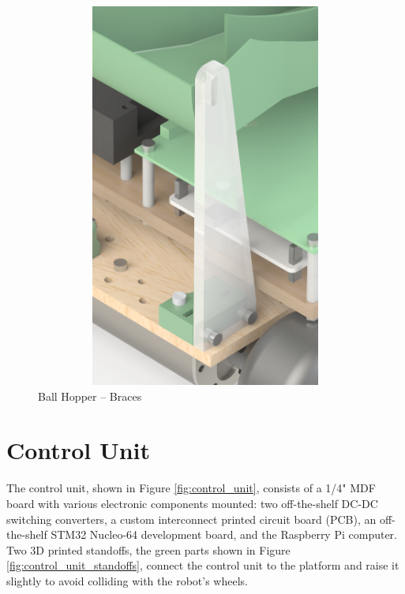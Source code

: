 \begin{figure}[H]   %
	\centering \includegraphics[width=6in, height=5in, keepaspectratio]{figures/hopper_brace.png}
	\caption{Ball Hopper -- Braces}	\label{fig:hopper_brace}
\end{figure}

\section{Control Unit}
The control unit, shown in Figure \ref{fig:control_unit}, consists of a 1/4" MDF board with various electronic components mounted: two off-the-shelf DC-DC switching converters, a custom interconnect printed circuit board (PCB), an off-the-shelf STM32 Nucleo-64 development board, and the Raspberry Pi computer. Two 3D printed standoffs, the green parts shown in Figure \ref{fig:control_unit_standoffs}, connect the control unit to the platform and raise it slightly to avoid colliding with the robot's wheels. 

